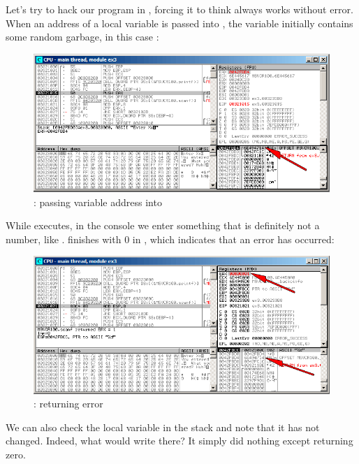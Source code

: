 \clearpage
{}

Let's try to hack our program in \olly, forcing it to think \scanf always works without error.
When an address of a local variable is passed into \scanf,
the variable initially contains some random garbage, in this case :

\begin{figure}[H]
\centering
\includegraphics[scale=\FigScale]{patterns/04_scanf/3_checking_retval/olly_1.png}
\caption{\olly: passing variable address into \scanf}
\label{fig:scanf_ex3_olly_1}
\end{figure}

\clearpage
While \scanf executes, in the console we enter something that is definitely not a number, like .
\scanf finishes with 0 in \EAX, which indicates that an error has occurred:

\begin{figure}[H]
\centering
\includegraphics[scale=\FigScale]{patterns/04_scanf/3_checking_retval/olly_2.png}
\caption{\olly: \scanf returning error}
\label{fig:scanf_ex3_olly_2}
\end{figure}

We can also check the local variable in the stack and note that it has not changed.
Indeed, what would \scanf write there?
It simply did nothing except returning zero.

